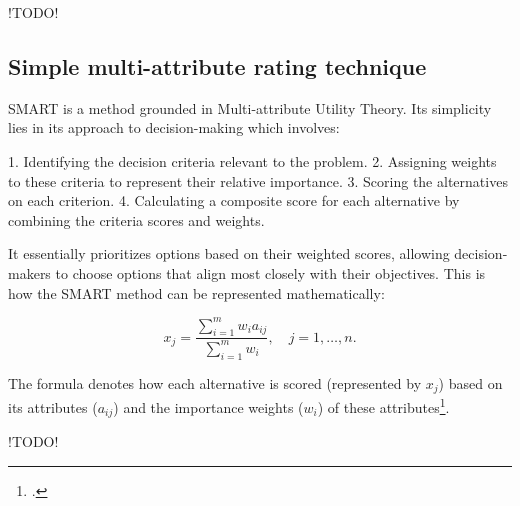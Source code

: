 !TODO!

\subsection{Simple multi-attribute rating technique}

\ac{SMART} is a method grounded in Multi-attribute Utility Theory. Its simplicity lies in its approach to decision-making which involves:

1. Identifying the decision criteria relevant to the problem.
2. Assigning weights to these criteria to represent their relative importance.
3. Scoring the alternatives on each criterion.
4. Calculating a composite score for each alternative by combining the criteria scores and weights.

It essentially prioritizes options based on their weighted scores, allowing decision-makers to choose options that align most closely with their objectives. 
This is how the SMART method can be represented mathematically:

\[ x_j = \frac{\sum_{i=1}^{m} w_i a_{ij}}{\sum_{i=1}^{m} w_i}, \quad j = 1, \ldots, n. \]

The formula denotes how each alternative is scored (represented by \(x_j\)) based on its attributes (\(a_{ij}\)) and the importance weights (\(w_i\)) of these attributes\footcite[p. 6]{fulopIntroductionDecisionMaking2005}.

!TODO!